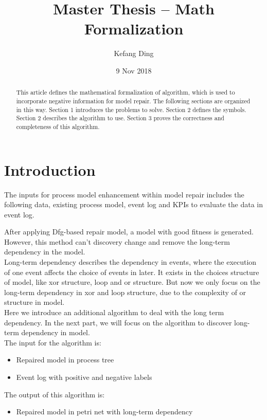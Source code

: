 \documentclass[]{article}
\title{Master Thesis --  Math Formalization}
\author{Kefang Ding}
\date{9 Nov 2018}
\begin{document}
\maketitle

\hrulefill
\hrulefill 

\begin{abstract}
This article defines the mathematical formalization of algorithm, which is used to incorporate negative information for model repair. The following sections are organized in this way. Section 1 introduces the  problems to solve. Section 2 defines the symbols. Section 2 describes the algorithm to use. Section 3 proves the correctness and completeness of this algorithm. 
\end{abstract}

\section{Introduction}
The inputs for process model enhancement within model repair includes the following data, existing process model, event log and KPIs to evaluate the data in event log. 

After applying Dfg-based repair model, a model with good fitness is generated. However, this method can't discovery  change and remove the long-term dependency in the model. \\
Long-term dependency describes the dependency in events, where the execution of one event affects the choice of events in later. It exists in the choices structure of model, like xor structure, loop and or structure. But now we only focus on the long-term dependency in xor and loop structure, due to the complexity of or structure in model. \\
Here we introduce an additional algorithm to deal with the long term dependency. In the next part, we will focus on the algorithm to discover long-term dependency in model. \\
The input for the algorithm is:
\begin{itemize}
	\item Repaired model in process tree
	\item Event log with positive and negative labels
\end{itemize}
The output of this algorithm is: 
\begin{itemize}
	\item Repaired model in petri net with long-term dependency
\end{itemize}
\end{document}
